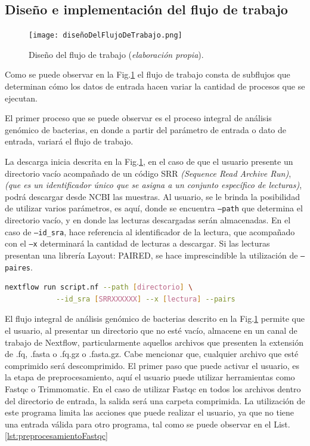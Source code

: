 \documentclass[12pt]{article}
\begin{document}
\subsection{Diseño e implementación del flujo de trabajo}

\begin{figure}[ht!]
    \centering
    \small
    \texttt{[image: diseñoDelFlujoDeTrabajo.png]}
    \caption{Diseño del flujo de trabajo (\emph{elaboración propia}).} 
    \label{fig:disenoDelFlujoDeTrabajo}
\end{figure}

Como se puede observar en la Fig.\ref{fig:disenoDelFlujoDeTrabajo} el flujo de trabajo 
consta de subflujos que determinan cómo los datos de entrada 
hacen variar la cantidad de procesos que se ejecutan.

El primer proceso que se puede observar es el proceso 
integral de análisis genómico de bacterias, en donde a partir 
del parámetro de entrada o dato de entrada, variará el flujo de 
trabajo.

La descarga inicia descrita en la Fig.\ref{fig:disenoDelFlujoDeTrabajo}, 
en el caso de que el usuario presente un directorio vacío 
acompañado de un código SRR \emph{(Sequence Read Archive Run)}, 
\emph{(que es un identificador único que se asigna a un conjunto 
específico de lecturas)}, podrá descargar desde NCBI las 
muestras. Al usuario, se le brinda la posibilidad de utilizar 
varios parámetros, es aquí, donde se encuentra \texttt{--path} que 
determina el directorio vacío, y en donde las lecturas
descargadas serán almacenadas. En el caso de \texttt{--id\_sra},
hace referencia al identificador de la lectura, que acompañado 
con el \texttt{--x} determinará la cantidad de lecturas a descargar. Si 
las lecturas presentan una librería Layout: PAIRED, se hace 
imprescindible la utilización de \texttt{--paires}.

\begin{center}
    \begin{lstlisting}[language=bash, caption=Sub-flujo de trabajo para la descarga inicial de lecturas \emph{(elaboración propia)}., label=lst:descargaInicial]
        nextflow run script.nf --path [directorio] \
            --id_sra [SRRXXXXXX] --x [lectura] --pairs
    \end{lstlisting}
\end{center}

El flujo integral de análisis genómico de bacterias 
descrito en la Fig.\ref{fig:disenoDelFlujoDeTrabajo} permite 
que el usuario, al presentar un directorio que no esté vacío,  
almacene en un canal de trabajo 
de Nextflow, particularmente aquellos archivos que presenten la 
extensión de .fq, .fasta o .fq.gz o .fasta.gz. Cabe mencionar que, 
cualquier archivo que esté comprimido será descomprimido. El primer 
paso que puede activar el usuario, es la etapa de preprocesamiento, 
aquí el usuario puede utilizar herramientas como Fastqc o Trimmomatic. 
En el caso de utilizar Fastqc en todos los archivos dentro del 
directorio de entrada, la salida será una carpeta comprimida. La 
utilización de este programa limita las acciones que puede realizar 
el usuario, ya que no tiene una entrada válida para otro programa, 
tal como se puede observar en el List.\ref{lst:preprocesamientoFastqc}
\end{document}
